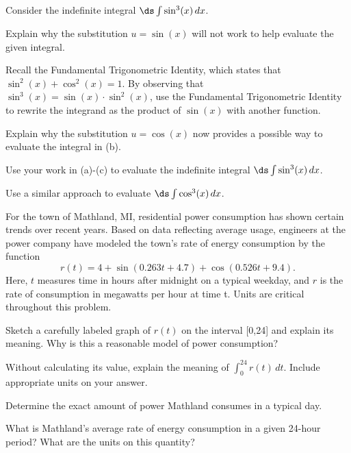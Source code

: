 \begin{exercises}
  \item Consider the indefinite integral $\ds \int \sin^3(x) \, dx$. 
  \ba
  	\item Explain why the substitution $u = \sin(x)$ will not work to help evaluate the given integral.
	\item Recall the Fundamental Trigonometric Identity, which states that $\sin^2(x) + \cos^2(x) = 1$.  By observing that $\sin^3(x) = \sin(x) \cdot \sin^2(x)$, use the Fundamental Trigonometric Identity to rewrite the integrand as the product of $\sin(x)$ with another function.
	\item Explain why the substitution $u = \cos(x)$ now provides a possible way to evaluate the integral in (b).
	\item Use your work in (a)-(c) to evaluate the  indefinite integral $\ds \int \sin^3(x) \, dx$.
	\item Use a similar approach to evaluate $\ds \int \cos^3(x) \, dx$.
  \ea
  
  \item For the town of Mathland, MI, residential power consumption has shown certain trends over recent years.  Based on data reflecting average usage, engineers at the power company have modeled the town's rate of energy consumption by the function
 $$r(t) = 4 + \sin(0.263t + 4.7) + \cos(0.526t+9.4).$$
Here, $t$ measures time in hours after midnight on a typical weekday, and $r$ is the rate of consumption in megawatts per hour at time t. 
Units are critical throughout this problem.
	\ba
		\item Sketch a carefully labeled graph of $r(t)$ on the interval [0,24] and explain its meaning.  Why is this a reasonable model of power consumption?
		\item Without calculating its value, explain the meaning of $\int_0^{24} r(t) \, dt$.   Include appropriate units on your answer.
		
  		\item Determine the exact amount of power Mathland consumes in a typical day.  
		\item What is Mathland's average rate of energy consumption in a given 24-hour period?  What are the units on this quantity?
	\ea
\end{exercises}
\afterexercises

